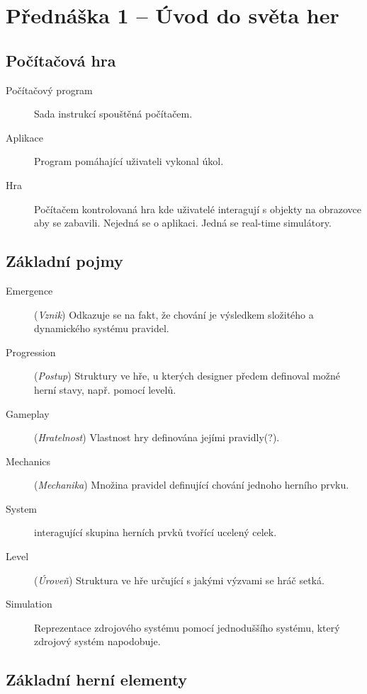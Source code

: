\section{Přednáška 1 -- Úvod do světa her}

\subsection*{Počítačová hra}

\medskip

\begin{description}
    \item[Počítačový program] Sada instrukcí spouštěná počítačem.
    \item[Aplikace] Program pomáhající uživateli vykonal úkol.
    \item[Hra] Počítačem kontrolovaná hra kde uživatelé interagují s objekty na obrazovce aby se zabavili. Nejedná se o aplikaci. Jedná se real-time simulátory.
\end{description}

\subsection*{Základní pojmy}

\medskip

\begin{description}
    \item[Emergence] (\textit{Vznik}) Odkazuje se na fakt, že chování je výsledkem složitého a dynamického systému pravidel.
    \item[Progression] (\textit{Postup}) Struktury ve hře, u kterých designer předem definoval možné herní stavy, např. pomocí levelů.
    \item[Gameplay] (\textit{Hratelnost}) Vlastnost hry definována jejími pravidly(?).
    \item[Mechanics] (\textit{Mechanika}) Množina pravidel definující chování jednoho herního prvku.
    \item[System] interagující skupina herních prvků tvořící ucelený celek.
    \item[Level] (\textit{Úroveň}) Struktura ve hře určující s jakými výzvami se hráč setká.
    \item[Simulation] Reprezentace zdrojového systému pomocí jednoduššího systému, který zdrojový systém napodobuje.
\end{description}

\subsection*{Základní herní elementy}

